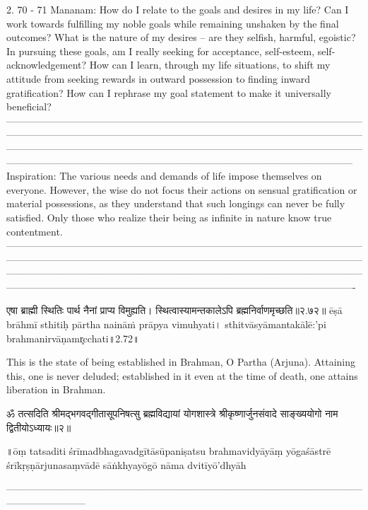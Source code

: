 2. 70 - 71 Mananam:
How do I relate to the goals and desires in my life? Can I work towards fulfilling my noble goals while remaining unshaken by the final outcomes? What is the nature of my desires – are they selfish, harmful, egoistic?
In pursuing these goals, am I really seeking for acceptance, self-esteem, self-acknowledgement? How can I learn, through my life situations, to shift my attitude from seeking rewards in outward possession to finding inward gratification? How can I rephrase my goal statement to make it universally beneficial?
—------------------------------------------------------------------------------------------------------------------------------------------------------------------------------------------------------------------------------------------------------------------------------------------------------------------------------------------------------------------------------------------------------------------------------------------
Inspiration: 
The various needs and demands of life impose themselves on everyone. However,  the wise do not focus their actions on sensual gratification or material possessions, as they understand that such longings can never be fully satisfied.
Only those who realize their being as infinite in nature know true contentment.
—-------------------------------------------------------------------------------------------------------------------------------------------------------------------------------------------------------------------------------------------------------------------------------------------------------------------------------------------------------------------------------------------------------------------------------------------

एषा ब्राह्मी स्थितिः पार्थ नैनां प्राप्य विमुह्यति।
स्थित्वास्यामन्तकालेऽपि ब्रह्मनिर्वाणमृच्छति॥२.७२॥
ēṣā brāhmī sthitiḥ pārtha naināṁ prāpya vimuhyati।
sthitvāsyāmantakālē:'pi brahmanirvāṇamr̥cchati॥2.72॥

This is the state of being established in Brahman, O Partha (Arjuna). Attaining this,  one is never deluded; established in it even at the time of death, one attains liberation in Brahman.

ॐ तत्सदिति श्रीमद्भगवद्गीतासूपनिषत्सु ब्रह्मविद्यायां योगशास्त्रे श्रीकृष्णार्जुनसंवादे साङ्ख्ययोगो नाम द्वितीयोऽध्यायः॥२॥

॥ōṃ tatsaditi śrīmadbhagavadgītāsūpaniṣatsu brahmavidyāyāṃ yōgaśāstrē śrīkṛṣṇārjunasaṃvādē sāṅkhyayōgō nāma dvitīyō'dhyāh

—---------------------------------------------------------------------------------------------------------------------------------
